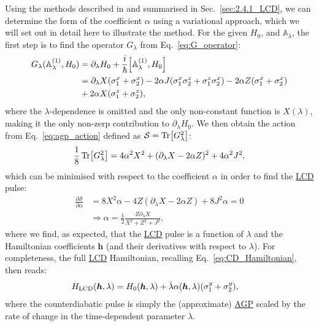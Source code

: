 \documentclass[a4paper,oneside,11pt]{book}
\newcommand{\hbb}{\boldsymbol{h}}
\newcommand{\sx}{\sigma^x}
\newcommand{\sy}{\sigma^y}
\newcommand{\sz}{\sigma^z}
\newcommand{\dlambda}{\partial_{\lambda}}
\newcommand{\dotlambda}{\dot{\lambda}}
\newcommand{\approxAGP}{\mathbb{A}_{\lambda}}
\newcommand{\acrref}[1]{\hyperref[acr:#1]{#1}}
\begin{document}
Using the methods described in \cite{sels_minimizing_2017} and summarised in Sec.~\ref{sec:2.4.1_LCD}, we can determine the form of the coefficient $\alpha$ using a variational approach, which we will set out in detail here to illustrate the method. For the given $H_0$, and $\approxAGP$, the first step is to find the operator $G_{\lambda}$ from Eq.~\ref{eq:G_operator}:
\begin{equation}
    \begin{aligned}
        G_{\lambda}(\approxAGP^{(1)}, H_0) &= \dlambda H_0 + \frac{i}{\hbar} \comm{\approxAGP^{(1)}}{H_0} \\
        &= \dlambda {X} (\sx_{1} + \sx_{2}) - 2 \alpha J (\sx_1\sz_2 + \sz_1\sx_2) - 2 \alpha Z (\sx_{1} + \sx_{2}) \\
        &+ 2 \alpha X (\sz_{1} + \sz_{2}),
    \end{aligned}
\end{equation}
where the $\lambda$-dependence is omitted and the only non-constant function is $X(\lambda)$, making it the only non-zerp contribution to $\dlambda H_0$. We then obtain the action from Eq.~\eqref{eq:agp_action} defined as $\mathcal{S} = \Tr[G^2_{\lambda}]$:
\begin{equation}
    \frac{1}{8} \Tr[G^2_{\lambda}] = 4 \alpha^2 X^2 + (\dlambda X - 2 \alpha Z)^2 + 4 \alpha^2 J^2,
\end{equation}
which can be minimised with respect to the coefficient $\alpha$ in order to find the \acrref{LCD} pulse:
\begin{equation}
    \begin{aligned}
        \frac{\partial \mathcal{S}}{\partial \alpha} &= 8X^2\alpha - 4Z(\dlambda X - 2 \alpha Z) + 8 J^2 \alpha = 0 \\
        & \Rightarrow \alpha = \frac{1}{2} \frac{Z \dlambda X}{X^2 + Z^2 + J^2},
    \end{aligned}
\end{equation}
where we find, as expected, that the \acrref{LCD} pulse is a function of $\lambda$ and the Hamiltonian coefficients $\hbb$ (and their derivatives with respect to $\lambda$). For completeness, the full \acrref{LCD} Hamiltonian, recalling Eq.~\eqref{eq:CD_Hamiltonian}, then reads:
\begin{equation}\label{eq:FO_LCD_H}
    \begin{aligned}
        H_{\rm LCD}(\hbb, \lambda) &= H_0(\hbb, \lambda) + \dotlambda \alpha(\hbb, \lambda) (\sy_{1} + \sy_{2}),
    \end{aligned}
\end{equation}
where the counterdiabatic pulse is simply the (approximate) \acrref{AGP} scaled by the rate of change in the time-dependent parameter $\lambda$.
\end{document}
